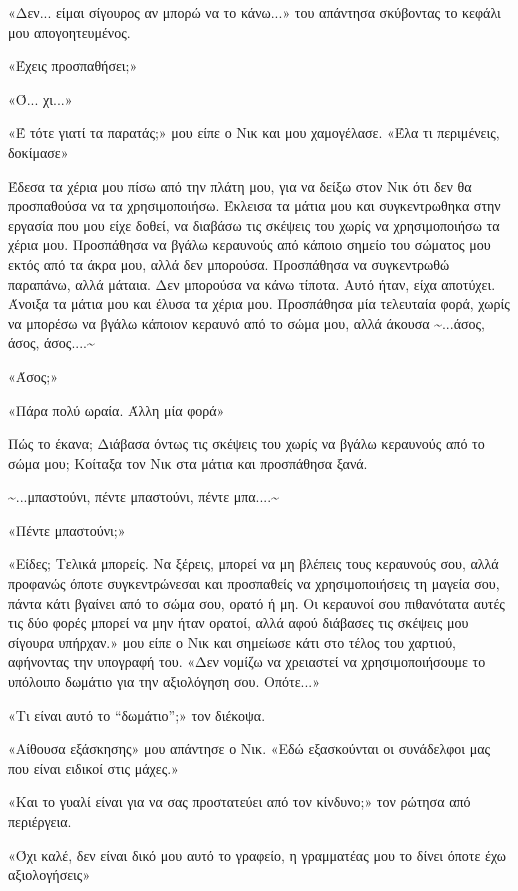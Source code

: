 \documentclass[12pt,twoside, openany]{book}
\begin{document}
«Δεν... είμαι σίγουρος αν μπορώ να το κάνω...» του απάντησα σκύβοντας το κεφάλι μου απογοητευμένος.

«Έχεις προσπαθήσει;»

«Ό... χι...»

«Έ τότε γιατί τα παρατάς;» μου είπε ο Νικ και μου χαμογέλασε. «Έλα τι περιμένεις, δοκίμασε»

Έδεσα τα χέρια μου πίσω από την πλάτη μου, για να δείξω στον Νικ ότι δεν θα προσπαθούσα να τα χρησιμοποιήσω. Έκλεισα τα μάτια μου και συγκεντρωθηκα στην εργασία που μου είχε δοθεί, να διαβάσω τις σκέψεις του χωρίς να χρησιμοποιήσω τα χέρια μου. Προσπάθησα να βγάλω κεραυνούς από κάποιο σημείο του σώματος μου εκτός από τα άκρα μου, αλλά δεν μπορούσα. Προσπάθησα να συγκεντρωθώ παραπάνω, αλλά μάταια. Δεν μπορούσα να κάνω τίποτα. Αυτό ήταν, είχα αποτύχει. Άνοιξα τα μάτια μου και έλυσα τα χέρια μου. Προσπάθησα μία τελευταία φορά, χωρίς να μπορέσω να βγάλω κάποιον κεραυνό από το σώμα μου, αλλά άκουσα \textasciitilde ...άσος, άσος, άσος....\textasciitilde 

«Άσος;»

«Πάρα πολύ ωραία. Άλλη μία φορά»

Πώς το έκανα; Διάβασα όντως τις σκέψεις του χωρίς να βγάλω κεραυνούς από το σώμα μου; Κοίταξα τον Νικ στα μάτια και προσπάθησα ξανά.

\textasciitilde ...μπαστούνι, πέντε μπαστούνι, πέντε μπα....\textasciitilde 

«Πέντε μπαστούνι;»

«Είδες; Τελικά μπορείς. Να ξέρεις, μπορεί να μη βλέπεις τους κεραυνούς σου, αλλά προφανώς όποτε συγκεντρώνεσαι και προσπαθείς να χρησιμοποιήσεις τη μαγεία σου, πάντα κάτι βγαίνει από το σώμα σου, ορατό ή μη. Οι κεραυνοί σου πιθανότατα αυτές τις δύο φορές μπορεί να μην ήταν ορατοί, αλλά αφού διάβασες τις σκέψεις μου σίγουρα υπήρχαν.» μου είπε ο Νικ και σημείωσε κάτι στο τέλος του χαρτιού, αφήνοντας την υπογραφή του. «Δεν νομίζω να χρειαστεί να χρησιμοποιήσουμε το υπόλοιπο δωμάτιο για την αξιολόγηση σου. Οπότε...»

«Τι είναι αυτό το “δωμάτιο”;» τον διέκοψα.

«Αίθουσα εξάσκησης» μου απάντησε ο Νικ. «Εδώ εξασκούνται οι συνάδελφοι μας που είναι ειδικοί στις μάχες.»

«Και το γυαλί είναι για να σας προστατεύει από τον κίνδυνο;» τον ρώτησα από περιέργεια.

«Όχι καλέ, δεν είναι δικό μου αυτό το γραφείο, η γραμματέας μου το δίνει όποτε έχω αξιολογήσεις»
\end{document}
